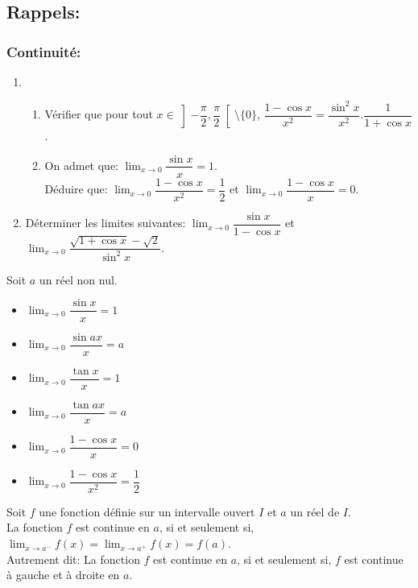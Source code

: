 \documentclass[12pt,a4paper,x11names,usenames,dvipsnames,svgnames,oneside]{book}
\def\ds{\displaystyle}
\begin{document}
\pagestyle{empty}
	\tableofcontents
	\chapter{}
	\section{Rappels:}
	\subsection{Continuité:}
	\begin{act}
	\begin{enumerate}
	\item \begin{enumerate}
	\item Vérifier que pour tout $x\in\left]-\dfrac{\pi}{2},\dfrac{\pi}{2}\right[\setminus\{0\}$, $\dfrac{1-\cos x}{x^2}=\dfrac{\sin^2x}{x^2}.\dfrac{1}{1+\cos x}$.
	\item On admet que: $\ds \lim_{x\to 0} \dfrac{\sin x}{x}=1$.\\
	Déduire que: $\ds \lim_{x\to 0}\dfrac{1-\cos x}{x^2}=\dfrac{1}{2}$ et $\ds \lim_{x\to 0} \dfrac{1-\cos x}{x}=0$.
	\end{enumerate}
	\item Déterminer les limites suivantes: $\ds \lim_{x\to 0}\dfrac{\sin x}{1-\cos x}$ et $\ds \lim_{x\to 0}\dfrac{\sqrt{1+\cos x}-\sqrt{2}}{\sin^2x}$.
	\end{enumerate}
	\end{act}
	\begin{thr}
	Soit $a$ un réel non nul.
	\begin{multicols}{3}
	\begin{itemize}
	\item $\ds \lim_{x\to 0}\dfrac{\sin x}{x}=1$
	\item $\ds \lim_{x\to 0}\dfrac{\sin ax}{x}=a$
	\item $\ds \lim_{x\to 0}\dfrac{\tan x}{x}=1$
	\item $\ds \lim_{x\to 0}\dfrac{\tan ax}{x}=a$
	\item $\ds \lim_{x\to 0}\dfrac{1-\cos x}{x}=0$
	\item $\ds \lim_{x\to 0}\dfrac{1-\cos x}{x^2}=\dfrac{1}{2}$
	\end{itemize}
	\end{multicols}
	\end{thr}
\begin{thr}
Soit $f$ une fonction définie sur un intervalle ouvert $I$ et $a$ un réel de $I$.\\
La fonction $f$ est continue en $a$, si et seulement si, $\lim_{x\to a^-}f(x)=\lim_{x\to a^+}f(x)=f(a)$.\\
Autrement dit: La fonction $f$ est continue en $a$, si et seulement si, $f$ est continue à gauche et à droite en $a$.
\end{thr}
\end{document}
